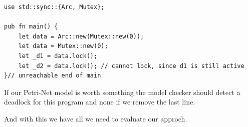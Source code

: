 \begin{lstlisting}
use std::sync::{Arc, Mutex};

pub fn main() {
    let data = Arc::new(Mutex::new(0));
    let data = Mutex::new(0);
    let _d1 = data.lock();
    let _d2 = data.lock(); // cannot lock, since d1 is still active
}// unreachable end of main
\end{lstlisting}
If our Petri-Net model is worth something the model checker should detect a deadlock for this program and none if we remove the last line.

And with this we have all we need to evaluate our approch.
